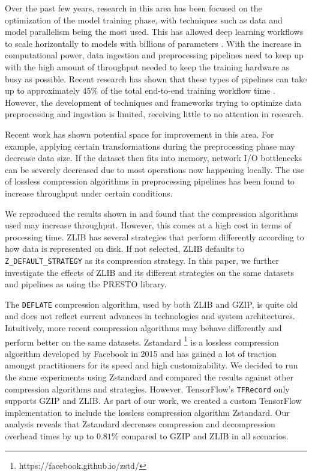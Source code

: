 \documentclass[sigconf,nonacm]{acmart}
\begin{document}
Over the past few years, research in this area has been focused on the optimization of the model training phase, with techniques such as data and model parallelism being the most used.
This has allowed deep learning workflows to scale horizontally to models with billions of parameters \cite{smith2022deepspeed}.
With the increase in computational power, data ingestion and preprocessing pipelines need to keep up with the high amount of throughput needed to keep the training hardware as busy as possible.
Recent research has shown that these types of pipelines can take up to approximately 45\% of the total end-to-end training workflow time \cite{xin2021productionml}.
However, the development of techniques and frameworks trying to optimize data preprocessing and ingestion is limited, receiving little to no attention in research.

Recent work \cite{isenko2022bottleneck} has shown potential space for improvement in this area.
For example, applying certain transformations during the preprocessing phase may decrease data size.
If the dataset then fits into memory, network I/O bottlenecks can be severely decreased due to most operations now happening locally.
The use of lossless compression algorithms in preprocessing pipelines has been found to increase throughput under certain conditions.

We reproduced the results shown in \cite{isenko2022bottleneck} and found that the compression algorithms used may increase throughput.
However, this comes at a high cost in terms of processing time.
ZLIB has several strategies that perform differently according to how data is represented on disk.
If not selected, ZLIB defaults to \texttt{Z\_DEFAULT\_STRATEGY} as its compression strategy.
In this paper, we further investigate the effects of ZLIB and its different strategies on the same datasets and pipelines as \cite{isenko2022bottleneck} using the PRESTO library.

The \texttt{DEFLATE} compression algorithm, used by both ZLIB and GZIP, is quite old and does not reflect current advances in technologies and system architectures.
Intuitively, more recent compression algorithms may behave differently and perform better on the same datasets.
Zstandard \footnote{https://facebook.github.io/zstd/} is a lossless compression algorithm developed by Facebook in 2015 and has gained a lot of traction amongst practitioners for its speed and high customizability.
We decided to run the same experiments using Zstandard and compared the results against other compression algorithms and strategies.
However, TensorFlow's \texttt{TFRecord} only supports GZIP and ZLIB.
As part of our work, we created a custom TensorFlow implementation to include the lossless compression algorithm Zstandard.
Our analysis reveals that Zstandard decreases compression and decompression overhead times by up to $0.81\%$ compared to GZIP and ZLIB in all scenarios.
\end{document}
